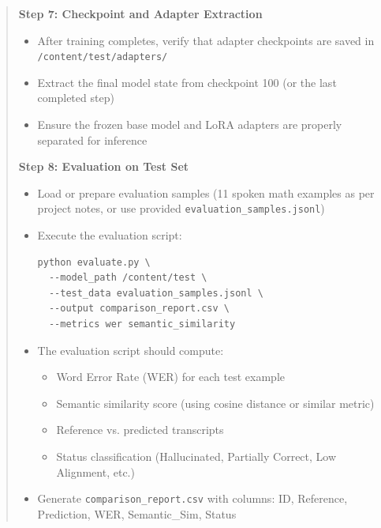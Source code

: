 \documentclass[12pt,a4paper]{article}
\begin{document}
\begin{quote}
{\textbf{Step 7: Checkpoint and Adapter Extraction}
\begin{itemize}
    \item After training completes, verify that adapter checkpoints are saved in \texttt{/content/test/adapters/}
    \item Extract the final model state from checkpoint 100 (or the last completed step)
    \item Ensure the frozen base model and LoRA adapters are properly separated for inference
\end{itemize}

\textbf{Step 8: Evaluation on Test Set}
\begin{itemize}
    \item Load or prepare evaluation samples (11 spoken math examples as per project notes, or use provided \texttt{evaluation\_samples.jsonl})
    \item Execute the evaluation script:
    \begin{verbatim}
python evaluate.py \
  --model_path /content/test \
  --test_data evaluation_samples.jsonl \
  --output comparison_report.csv \
  --metrics wer semantic_similarity
    \end{verbatim}
    \item The evaluation script should compute:
    \begin{itemize}
        \item Word Error Rate (WER) for each test example
        \item Semantic similarity score (using cosine distance or similar metric)
        \item Reference vs. predicted transcripts
        \item Status classification (Hallucinated, Partially Correct, Low Alignment, etc.)
    \end{itemize}
    \item Generate \texttt{comparison\_report.csv} with columns: ID, Reference, Prediction, WER, Semantic\_Sim, Status
\end{itemize}

}
\end{quote}
\end{document}
